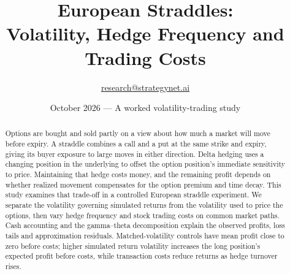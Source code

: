 \documentclass[8pt]{strategynet-journal}
\title{European Straddles:\\Volatility, Hedge Frequency and Trading Costs}
\author{\href{mailto:research@strategynet.ai}{research@strategynet.ai}}
\date{October 2026 --- A worked volatility-trading study}
\begin{document}
\maketitle
\begin{abstract}
\normalsize Options are bought and sold partly on a view about how much a market will move before expiry. A straddle combines a call and a put at the same strike and expiry, giving its buyer exposure to large moves in either direction. Delta hedging uses a changing position in the underlying to offset the option position's immediate sensitivity to price. Maintaining that hedge costs money, and the remaining profit depends on whether realized movement compensates for the option premium and time decay. This study examines that trade-off in a controlled European straddle experiment. We separate the volatility governing simulated returns from the volatility used to price the options, then vary hedge frequency and stock trading costs on common market paths. Cash accounting and the gamma--theta decomposition explain the observed profits, loss tails and approximation residuals. Matched-volatility controls have mean profit close to zero before costs; higher simulated return volatility increases the long position's expected profit before costs, while transaction costs reduce returns as hedge turnover rises.
\end{abstract}
\SNtwocolumntableofcontents
\end{document}
